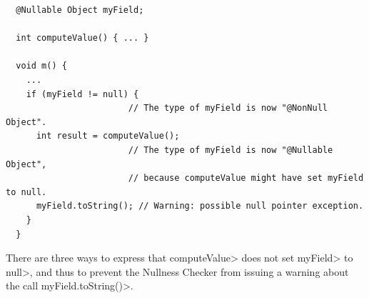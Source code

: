 \begin{Verbatim}
  @Nullable Object myField;

  int computeValue() { ... }

  void m() {
    ...
    if (myField != null) {
                        // The type of myField is now "@NonNull Object".
      int result = computeValue();
                        // The type of myField is now "@Nullable Object",
                        // because computeValue might have set myField to null.
      myField.toString(); // Warning: possible null pointer exception.
    }
  }
\end{Verbatim}

There are three
ways to express that \<computeValue> does not set
\<myField> to \<null>, and thus to prevent the Nullness Checker from
issuing a warning about the call \<myField.toString()>.

